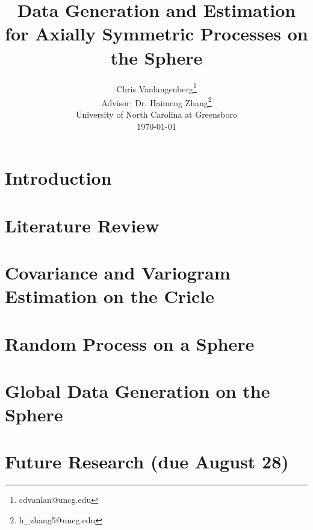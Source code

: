 
\usepackage{graphicx}

\usepackage{Sweave}




\title{{\bf\Large Data Generation and Estimation for Axially Symmetric Processes on the Sphere }}


\author{Chris Vanlangenberg\footnote{cdvanlan@uncg.edu} \\
\bigskip
Advisor: Dr. Haimeng Zhang\footnote{h\_zhang5@uncg.edu}\\ \small{University of North Carolina at Greensboro}\\
\small \today}

\maketitle 
\thispagestyle{empty}



\newpage
\chapter{Introduction}


\chapter{Literature Review}
%


\chapter{Covariance and Variogram Estimation on the Cricle}


\chapter{Random Process on a Sphere}


\chapter{Global Data Generation on the Sphere}


\chapter{Future Research (due August 28)}




